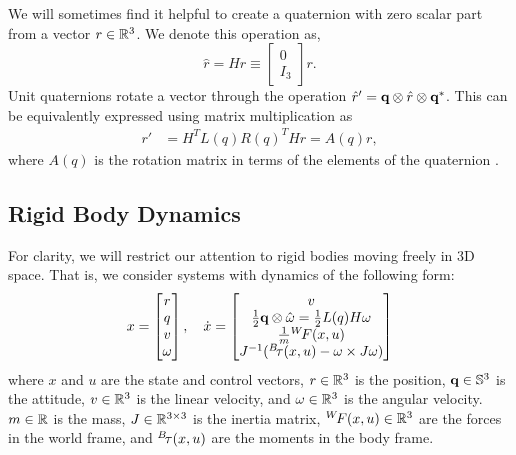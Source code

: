 \documentclass[../root.tex]{subfiles}
\begin{document}
        We will sometimes find it helpful to create a quaternion with zero scalar part from 
        a vector $r \in \mathbb{R}^3$. We denote this operation as,
        \begin{equation}
            \hat{r} = H r \equiv \begin{bmatrix} 0 \\ I_3 \end{bmatrix} r.
        \end{equation}
        Unit quaternions rotate a vector through the operation 
        $\hat{r}' = \textbf{q} \otimes \hat{r} \otimes \textbf{q}^*$. 
        This can be equivalently expressed using matrix multiplication as
        \begin{align} 
            r' &= H^T L(q) R(q)^T H r = A(q)r , \label{eq:quaternion_rotation}
        \end{align}
        where $A(q)$ is the rotation matrix in terms of the elements of the quaternion 
        \cite{kane_Spacecraft_1983}.

    \subsection{Rigid Body Dynamics} \label{sec:rigidbody_dynamics}
        For clarity, we will restrict our attention to rigid bodies moving freely in 3D 
        space. That is, we consider systems with dynamics of the following form:
        \begin{equation} \label{eq:rigid_body_dynamics}
            x = \begin{bmatrix} r \\ q \\ v \\ \omega \end{bmatrix}, \quad 
            \dot{x} = \begin{bmatrix} 
                v \\ 
                \frac{1}{2} \textbf{q} \otimes \hat{\omega} = \frac{1}{2} L(q) H \omega \\ 
                \frac{1}{m} {}^{W}\!F(x,u) \\ 
                J^{-1}({}^{B}\!\tau(x,u) - \omega \times J \omega) 
            \end{bmatrix}
        \end{equation}
        where $x$ and $u$ are the state and control vectors, $r \in \mathbb{R}^3$ is the
        position, $\textbf{q} \in \mathbb{S}^3$ is the attitude, $v \in \mathbb{R}^3$ is the linear velocity, and
        $\omega \in \mathbb{R}^3$ is the angular velocity. $m \in \mathbb{R}$ is the mass, $J \in
        \mathbb{R}^{3\times3}$ is the inertia matrix, ${}^{W}\!F(x,u) \in \mathbb{R}^3$ are the
        forces in the world frame, and ${}^{B}\!\tau(x,u)$ are the moments in the
        body frame.
\end{document}
